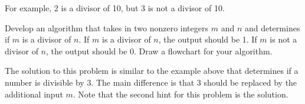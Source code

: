 \documentclass{ximera}
\begin{document}
For example, 2 is a divisor of 10, but 3 is not a divisor of 10.

\begin{question}
	Develop an algorithm that takes in two nonzero integers $m$ and $n$ and determines if $m$ is a divisor of $n$. If $m$ is a divisor of $n$, the output should be 1. If $m$ is not a divisor of $n$, the output should be 0. Draw a flowchart for your algorithm.
	\begin{hint}
		The solution to this problem is similar to the example above that determines if a number is divisible by 3. The main difference is that 3 should be replaced by the additional input $m$. Note that the second hint for this problem is the solution.
	\end{hint}
	\begin{hint}
		\begin{center}
		\end{center}
	\end{hint}
\end{question}
\end{document}
